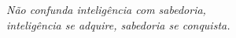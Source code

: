 \begin{epigrafe}
    \vspace*{\fill}
	\begin{flushright}

		\textit{Não confunda inteligência com sabedoria, \\
		inteligência se adquire, sabedoria se conquista.}
	\end{flushright}
\end{epigrafe}

